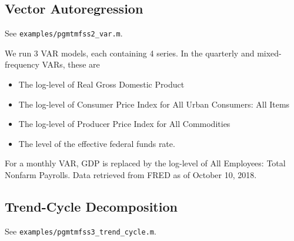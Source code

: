 \documentclass{article}
\begin{document}
\subsection{Vector Autoregression}

See \texttt{examples/pgmtmfss2\_var.m}. 

We run 3 VAR models, each containing 4 series. In the quarterly and mixed-frequency VARs, these are
\begin{itemize}
  \item The log-level of Real Gross Domestic Product
  \item The log-level of Consumer Price Index for All Urban Consumers: All Items
  \item The log-level of Producer Price Index for All Commodities
  \item The level of the effective federal funds rate.
\end{itemize}
For a monthly VAR, GDP is replaced by the log-level of All Employees: Total Nonfarm Payrolls. Data retrieved from FRED as of October 10, 2018. 

\subsection{Trend-Cycle Decomposition}

See \texttt{examples/pgmtmfss3\_trend\_cycle.m}. 
\end{document}

